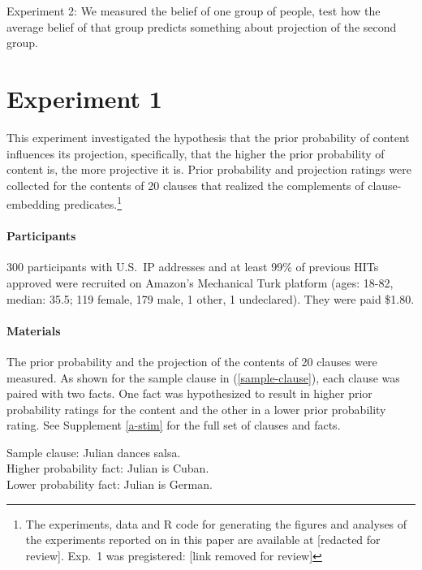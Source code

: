 \documentclass[11pt,fleqn]{article}
\newcommand{\6}{\mbox{$[\hspace*{-.6mm}[$}}
\newcommand{\9}{\mbox{$]\hspace*{-.6mm}]$}}
\begin{document}
Experiment 2: We measured the belief of one group of people, test how the average belief of that group predicts something about projection of the second group.

\newpage

\section{Experiment 1}

This experiment investigated the hypothesis that the prior probability of content influences its projection, specifically, that the higher the prior probability of content is, the more projective it is. Prior probability and projection ratings were collected for the contents of 20 clauses that realized the complements of clause-embedding predicates.\footnote{\label{f-github}The experiments, data and R code for generating the figures and analyses of the experiments reported on in this paper are available at [redacted for review]. Exp.~1 was pregistered: [link removed for review]}

\paragraph{Participants} 300 participants with U.S.\ IP addresses and at least 99\% of previous HITs approved were recruited on Amazon's Mechanical Turk platform (ages: 18-82, median: 35.5; 119 female, 179 male, 1 other, 1 undeclared). They were paid \$1.80.

\paragraph{Materials} The prior probability and the projection of the contents of 20 clauses were measured. As shown for the sample clause in (\ref{sample-clause}), each clause was paired with two facts. One fact was hypothesized to result in higher prior probability ratings for the content  and the other in a lower prior probability rating. See Supplement \ref{a-stim} for the full set of clauses and facts. 

\begin{exe}
\ex\label{sample-clause} Sample clause: Julian dances salsa.
\\ Higher probability fact: Julian is Cuban.
\\ Lower probability fact: Julian is German.
\end{exe}
\end{document}
